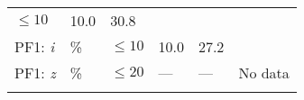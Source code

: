 \documentclass[DM,lsstdraft,toc]{lsstdoc}
\begin{document}
\begin{longtable}[]{@{}llllll@{}}
\begin{minipage}[t]{0.17\columnwidth}
\(\leq 10\)\strut
\end{minipage} & \begin{minipage}[t]{0.17\columnwidth}\raggedright\strut
10.0\strut
\end{minipage} & \begin{minipage}[t]{0.12\columnwidth}\raggedright\strut
30.8\strut
\end{minipage} & \begin{minipage}[t]{0.17\columnwidth}\raggedright\strut
\strut
\end{minipage}\tabularnewline
\begin{minipage}[t]{0.14\columnwidth}\raggedright\strut
PF1: \emph{i}\strut
\end{minipage} & \begin{minipage}[t]{0.06\columnwidth}\raggedright\strut
\%\strut
\end{minipage} & \begin{minipage}[t]{0.17\columnwidth}\raggedright\strut
\(\leq 10\)\strut
\end{minipage} & \begin{minipage}[t]{0.17\columnwidth}\raggedright\strut
10.0\strut
\end{minipage} & \begin{minipage}[t]{0.12\columnwidth}\raggedright\strut
27.2\strut
\end{minipage} & \begin{minipage}[t]{0.17\columnwidth}\raggedright\strut
\strut
\end{minipage}\tabularnewline
\begin{minipage}[t]{0.14\columnwidth}\raggedright\strut
PF1: \emph{z}\strut
\end{minipage} & \begin{minipage}[t]{0.06\columnwidth}\raggedright\strut
\%\strut
\end{minipage} & \begin{minipage}[t]{0.17\columnwidth}\raggedright\strut
\(\leq 20\)\strut
\end{minipage} & \begin{minipage}[t]{0.17\columnwidth}\raggedright\strut
---\strut
\end{minipage} & \begin{minipage}[t]{0.12\columnwidth}\raggedright\strut
---\strut
\end{minipage} & \begin{minipage}[t]{0.17\columnwidth}\raggedright\strut
No data\strut
\end{minipage}\tabularnewline
\begin{minipage}[t]{0.14\columnwidth}\raggedright\strut

\end{minipage}
\end{longtable}
\end{document}
